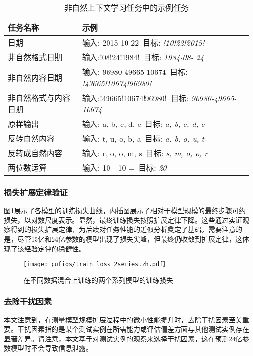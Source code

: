 \begin{table}[!htbp]
    \centering
    \label{tab:unnaturalicl}
    \caption{非自然上下文学习任务中的示例任务}
    \begin{tabular}{p{4cm}l}
        \toprule
        \textbf{任务名称}  & \textbf{示例} \\
        \midrule
        日期  & 输入: 2015-10-22\ 目标: \textit{!10!22!2015!}\\
        非自然格式日期  & 输入:!08!24!1984!\ 目标: \textit{1984-08- 24}\\
        非自然内容日期  & 输入: 96980-49665-10674\ 目标: \textit{!49665!10674!96980!}\\
        非自然格式与内容日期  & 输入:!49665!10674!96980!\ 目标: \textit{96980-49665-10674}\\
        原样输出  & 输入: a, b, c, d, e\ 目标: \textit{a, b, c, d, e} \\
        反转自然内容  & 输入: t, u, o, b, a\ 目标: \textit{a, b, o, u, t} \\
        反转成自然内容  & 输入: r, o, o, m, s\ 目标: \textit{s, m, o, o, r}  \\
        两位数运算  & 输入: 10 - 10 =\ 目标: \textit{20}\\
        \bottomrule
    \end{tabular}
    \label{tab:unnaturalincontextexample}
\end{table}



\subsubsection{损失扩展定律验证}
图\ref{fig:loss_scaling}展示了各模型的训练损失曲线，内插图展示了相对于模型规模的最终步骤可约损失，以对数尺度表示。显然，最终训练损失按照扩展定律下降。这些通过实证观察得到的损失扩展定律，为后续对任务性能的近似分析奠定了基础。需要注意的是，尽管15亿和24亿参数的模型出现了损失尖峰，但最终仍收敛到扩展定律，这体现了该经验定律的稳健性。


\begin{figure}[!htbp]
        \centering
        \texttt{[image: pufigs/train\_loss\_2series.zh.pdf]}
        \label{fig:train_loss_2series}
\caption{在不同数据混合上训练的两个系列模型的训练损失}
    \label{fig:loss_scaling}
\end{figure}



\subsubsection{去除干扰因素}
\label{app:removing_distracting}
本文注意到，在测量模型规模扩展过程中的微小性能提升时，去除干扰因素至关重要。干扰因素指的是某个测试实例在所需能力或评估偏差方面与其他测试实例存在显著差异。请注意，本文基于对测试实例的观察来选择干扰因素，这在预测24亿参数模型时不会导致信息泄露。

